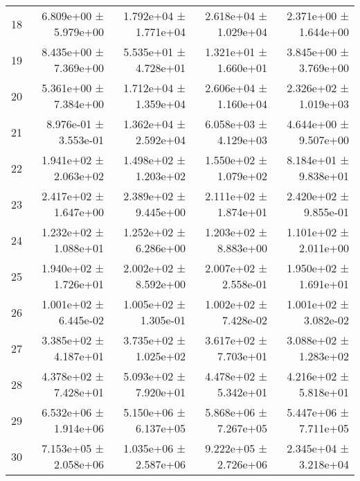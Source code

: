 \begin{table}[htbp]
\begin{tabular}{lrrrr}
18 & 6.809e+00 ± 5.979e+00 & 1.792e+04 ± 1.771e+04 & 2.618e+04 ± 1.029e+04 & 2.371e+00 ± 1.644e+00 \\
19 & 8.435e+00 ± 7.369e+00 & 5.535e+01 ± 4.728e+01 & 1.321e+01 ± 1.660e+01 & 3.845e+00 ± 3.769e+00 \\
20 & 5.361e+00 ± 7.384e+00 & 1.712e+04 ± 1.359e+04 & 2.606e+04 ± 1.160e+04 & 2.326e+02 ± 1.019e+03 \\
21 & 8.976e-01 ± 3.553e-01 & 1.362e+04 ± 2.592e+04 & 6.058e+03 ± 4.129e+03 & 4.644e+00 ± 9.507e+00 \\
22 & 1.941e+02 ± 2.063e+02 & 1.498e+02 ± 1.203e+02 & 1.550e+02 ± 1.079e+02 & 8.184e+01 ± 9.838e+01 \\
23 & 2.417e+02 ± 1.647e+00 & 2.389e+02 ± 9.445e+00 & 2.111e+02 ± 1.874e+01 & 2.420e+02 ± 9.855e-01 \\
24 & 1.232e+02 ± 1.088e+01 & 1.252e+02 ± 6.286e+00 & 1.203e+02 ± 8.883e+00 & 1.101e+02 ± 2.011e+00 \\
25 & 1.940e+02 ± 1.726e+01 & 2.002e+02 ± 8.592e+00 & 2.007e+02 ± 2.558e-01 & 1.950e+02 ± 1.691e+01 \\
26 & 1.001e+02 ± 6.445e-02 & 1.005e+02 ± 1.305e-01 & 1.002e+02 ± 7.428e-02 & 1.001e+02 ± 3.082e-02 \\
27 & 3.385e+02 ± 4.187e+01 & 3.735e+02 ± 1.025e+02 & 3.617e+02 ± 7.703e+01 & 3.088e+02 ± 1.283e+02 \\
28 & 4.378e+02 ± 7.428e+01 & 5.093e+02 ± 7.920e+01 & 4.478e+02 ± 5.342e+01 & 4.216e+02 ± 5.818e+01 \\
29 & 6.532e+06 ± 1.914e+06 & 5.150e+06 ± 6.137e+05 & 5.868e+06 ± 7.267e+05 & 5.447e+06 ± 7.711e+05 \\
30 & 7.153e+05 ± 2.058e+06 & 1.035e+06 ± 2.587e+06 & 9.222e+05 ± 2.726e+06 & 2.345e+04 ± 3.218e+04 \\
    \bottomrule
    \end{tabular}
    \end{table}
